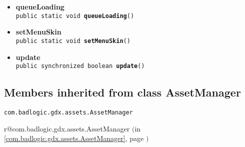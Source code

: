 \documentclass[11pt,a4paper]{report}
\makeatletter
\newcommand{\refdefined}[1]{
\expandafter\ifx\csname r@#1\endcsname\relax
\relax\else
{$($in \ref{#1}, page \pageref{#1}$)$}\fi}
\makeatother
\begin{document}
{{{\begin{itemize}
{\begin{itemize}
{Loads a map from the Storage based on it's id
}
\item{
{\bf  Parameters}
  \begin{itemize}
   \item{
\texttt{levelId} -- the id of the map to load}
  \end{itemize}
}%
\item{{\bf  Returns} -- 
the map loaded as a TiledMap 
}%
\end{itemize}
}%
\item{ 
{\bf  queueLoading}\\
\texttt{public static void\ {\bf  queueLoading}()
\label{com.retroMachines.data.AssetManager.queueLoading()}}%
}%
\item{ 
{\bf  setMenuSkin}\\
\texttt{public static void\ {\bf  setMenuSkin}()
\label{com.retroMachines.data.AssetManager.setMenuSkin()}}%
}%
\item{ 
{\bf  update}\\
\texttt{public synchronized boolean\ {\bf  update}()
\label{com.retroMachines.data.AssetManager.update()}}%
}%
\end{itemize}
}
\subsection{Members inherited from class AssetManager }{
\texttt{com.badlogic.gdx.assets.AssetManager} {\small 
\refdefined{com.badlogic.gdx.assets.AssetManager}}
{\small 

}}}}
\end{document}
